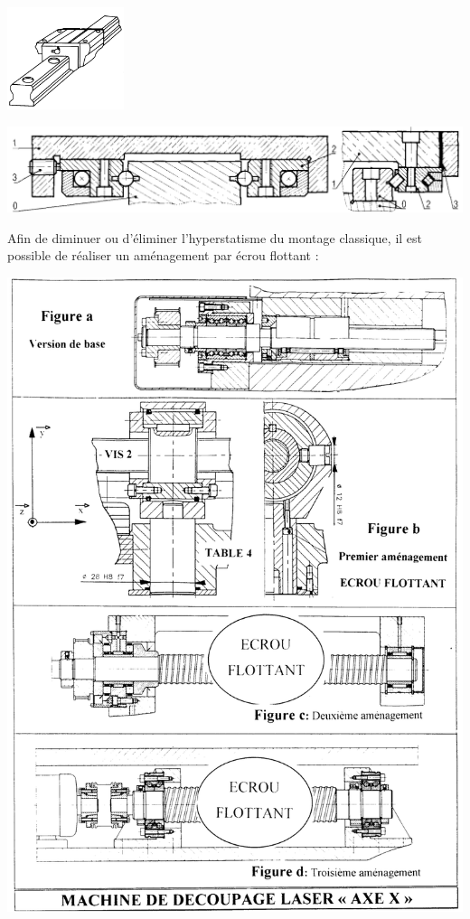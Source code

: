 \documentclass[11pt,oneside]{article}
\begin{document}
\begin{minipage}[c]{.2\linewidth}
\begin{center}
\includegraphics[height=3cm]{png/fig_108}
\end{center}
\end{minipage}\hfill
\begin{minipage}[c]{.75\linewidth}
\begin{center}
\includegraphics[width=\textwidth]{png/fig_109}
\end{center}
\end{minipage}

Afin de diminuer ou d’éliminer l’hyperstatisme du montage classique, il est possible de réaliser un aménagement par écrou flottant :

\begin{center}
\includegraphics[width=.8\textwidth]{png/fig_110}
\end{center}
\end{document}
